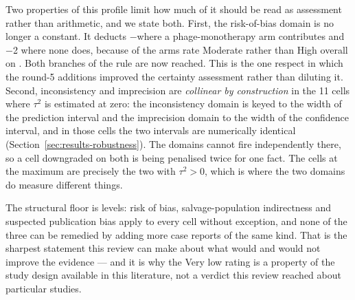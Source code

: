 Two properties of this profile limit how much of it should be read as assessment rather than arithmetic, and we state both. First, the risk-of-bias domain is no longer a constant. It deducts $-$\GradeRobDrop where a phage-monotherapy arm contributes and $-$2 where none does, because \RobOverallModerate of the \ArmsAnalysed arms rate Moderate rather than High overall on \textcite{Murad2018_casereports}. Both branches of the rule are now reached. This is the one respect in which the round-5 additions improved the certainty assessment rather than diluting it. Second, inconsistency and imprecision are \emph{collinear by construction} in the 11 cells where $\tau^2$ is estimated at zero: the inconsistency domain is keyed to the width of the prediction interval and the imprecision domain to the width of the confidence interval, and in those cells the two intervals are numerically identical (Section~\ref{sec:results-robustness}). The domains cannot fire independently there, so a cell downgraded on both is being penalised twice for one fact. The \GradeCellsAtMax cells at the maximum are precisely the two with $\tau^2 > 0$, which is where the two domains do measure different things.

The structural floor is \GradeStructuralMinimum levels: risk of bias, salvage-population indirectness and suspected publication bias apply to every cell without exception, and none of the three can be remedied by adding more case reports of the same kind. That is the sharpest statement this review can make about what would and would not improve the evidence --- and it is why the Very low rating is a property of the study design available in this literature, not a verdict this review reached about particular studies.

